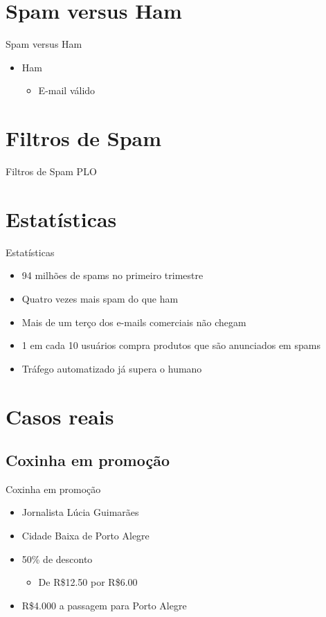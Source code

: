 \documentclass[dvipdfm]{beamer}
\begin{document}
\section{Spam versus Ham}
\begin{frame}{Spam versus Ham}
	\begin{itemize}
		\item Ham
		\begin{itemize}
			\item E-mail válido
		\end{itemize}
	\end{itemize}
\end{frame}

\section{Filtros de Spam}
\begin{frame}{Filtros de Spam}
	PLO
\end{frame}

\section{Estatísticas}
\begin{frame}{Estatísticas}
	\begin{itemize}
		\item 94 milhões de spams no primeiro trimestre
		\item Quatro vezes mais spam do que ham
		\item Mais de um terço dos e-mails comerciais não chegam
		\item 1 em cada 10 usuários compra produtos que são anunciados em spams
		\item Tráfego automatizado já supera o humano
	\end{itemize}
\end{frame}

\section{Casos reais}
\subsection{Coxinha em promoção}
\begin{frame}{Coxinha em promoção}
	\begin{itemize}
		\item Jornalista Lúcia Guimarães
		\item Cidade Baixa de Porto Alegre
		\item 50\% de desconto
		\begin{itemize}
			\item De R\$12.50 por R\$6.00
		\end{itemize}
		\item R\$4.000 a passagem para Porto Alegre
	\end{itemize}
\end{frame}
\end{document}
